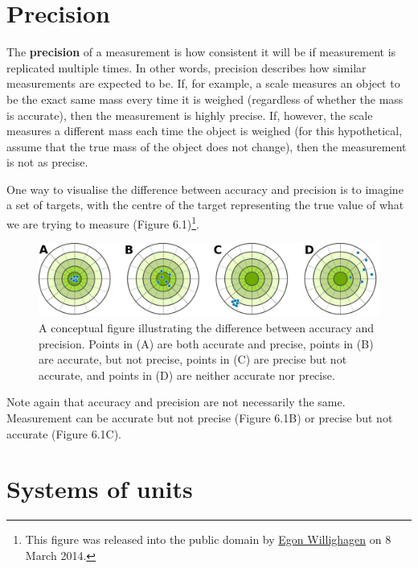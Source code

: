 \documentclass[
  openany]{scrbook}
\begin{document}
\hypertarget{precision}{%
\section{Precision}\label{precision}}

The \textbf{precision} of a measurement is how consistent it will be if measurement is replicated multiple times.
In other words, precision describes how similar measurements are expected to be.
If, for example, a scale measures an object to be the exact same mass every time it is weighed (regardless of whether the mass is accurate), then the measurement is highly precise.
If, however, the scale measures a different mass each time the object is weighed (for this hypothetical, assume that the true mass of the object does not change), then the measurement is not as precise.

One way to visualise the difference between accuracy and precision is to imagine a set of targets, with the centre of the target representing the true value of what we are trying to measure (Figure 6.1)\footnote{This figure was released into the public domain by \href{https://commons.wikimedia.org/wiki/File:Accuracy-vs-precision-nl.svg}{Egon Willighagen} on 8 March 2014.}.

\begin{figure}
\includegraphics[width=1\linewidth]{img/accuracy_vs_precision} \caption{A conceptual figure illustrating the difference between accuracy and precision. Points in (A) are both accurate and precise, points in (B) are accurate, but not precise, points in (C) are precise but not accurate, and points in (D) are neither accurate nor precise.}\label{fig:unnamed-chunk-22}
\end{figure}

Note again that accuracy and precision are not necessarily the same.
Measurement can be accurate but not precise (Figure 6.1B) or precise but not accurate (Figure 6.1C).

\hypertarget{systems-of-units}{%
\section{Systems of units}\label{systems-of-units}}
\end{document}
